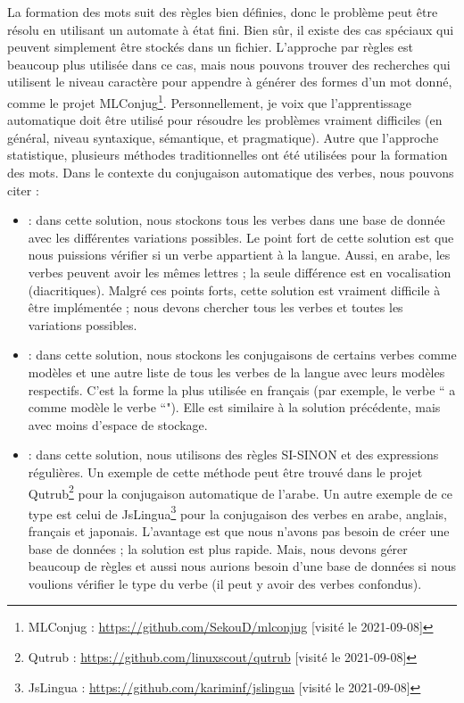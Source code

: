 \documentclass{KodeBook}
\begin{document}
La formation des mots suit des règles bien définies, donc le problème peut être résolu en utilisant un automate à état fini. 
Bien sûr, il existe des cas spéciaux qui peuvent simplement être stockés dans un fichier. 
L'approche par règles est beaucoup plus utilisée dans ce cas, mais nous pouvons trouver des recherches qui utilisent le niveau caractère pour appendre à générer des formes d'un mot donné, comme le projet MLConjug\footnote{MLConjug : \url{https://github.com/SekouD/mlconjug} [visité le 2021-09-08]}. 
Personnellement, je voix que l'apprentissage automatique doit être utilisé pour résoudre les problèmes vraiment difficiles (en général, niveau syntaxique, sémantique, et pragmatique). 
Autre que l'approche statistique, plusieurs méthodes traditionnelles ont été utilisées pour la formation des mots. 
Dans le contexte du conjugaison automatique des verbes, nous pouvons citer :
\begin{itemize}
	\item {} : dans cette solution, nous stockons tous les verbes dans une base de donnée avec les différentes variations possibles. 
	Le point fort de cette solution est que nous puissions vérifier si un verbe appartient à la langue. 
	Aussi, en arabe, les verbes peuvent avoir les mêmes lettres ; la seule différence est en vocalisation (diacritiques).
	Malgré ces points forts, cette solution est vraiment difficile à être implémentée ; nous devons chercher tous les verbes et toutes les variations possibles. 
	
	\item {} : dans cette solution, nous stockons les conjugaisons de certains verbes comme modèles et une autre liste de tous les verbes de la langue avec leurs modèles respectifs.
	C'est la forme la plus utilisée en français (par exemple, le verbe `` a comme modèle le verbe ``"). 
	Elle est similaire à la solution précédente, mais avec moins d'espace de stockage.
	
	\item {} : dans cette solution, nous utilisons des règles SI-SINON et des expressions régulières.
	Un exemple de cette méthode peut être trouvé dans le projet Qutrub\footnote{Qutrub : \url{https://github.com/linuxscout/qutrub} [visité le 2021-09-08]} pour la conjugaison automatique de l'arabe.  
	Un autre exemple de ce type est celui de JsLingua\footnote{JsLingua : \url{https://github.com/kariminf/jslingua} [visité le 2021-09-08]} pour la conjugaison des verbes en arabe, anglais, français et japonais. 
	L'avantage est que nous n'avons pas besoin de créer une base de données ; la solution est plus rapide. 
	Mais, nous devons gérer beaucoup de règles et aussi nous aurions besoin d'une base de données si nous voulions vérifier le type du verbe (il peut y avoir des verbes confondus).

\end{itemize}
\end{document}
